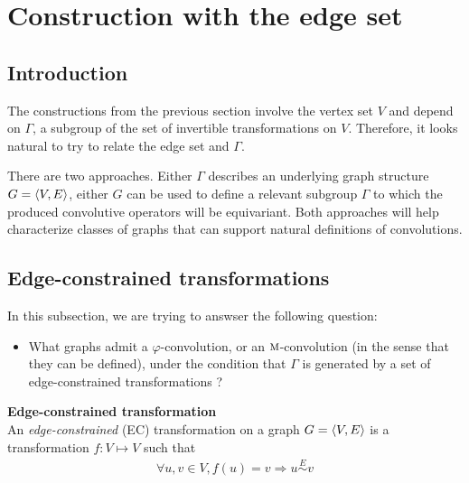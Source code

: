 \section{Construction with the edge set}
\label{sec:edges}

\subsection{Introduction}

The constructions from the previous section involve the vertex set $V$ and depend on $\Gamma$, a subgroup of the set of invertible transformations on $V$. Therefore, it looks natural to try to relate the edge set and $\Gamma$.

There are two approaches. Either $\Gamma$ describes an underlying graph structure $G = \langle V, E \rangle$, either $G$ can be used to define a relevant subgroup $\Gamma$ to which the produced convolutive operators will be equivariant. Both approaches will help characterize classes of graphs that can support natural definitions of convolutions.




\subsection{Edge-constrained transformations}

In this subsection, we are trying to answser the following question:
\begin{itemize}
	\item What graphs admit a $\varphi$-convolution, or an $\operatorname{\textsc{m}}$-convolution (in the sense that they can be defined), under the condition that $\Gamma$ is generated by a set of edge-constrained transformations ?
\end{itemize}

\begin{definition}\textbf{Edge-constrained transformation}\\
An \emph{edge-constrained} (EC) transformation on a graph $G = \langle V, E \rangle$ is a transformation $f: V \mapsto V$ such that
\begin{gather*}
\forall u,v \in V, f(u) = v \Rightarrow u \overset{E}{\sim} v
\end{gather*}
\end{definition}

